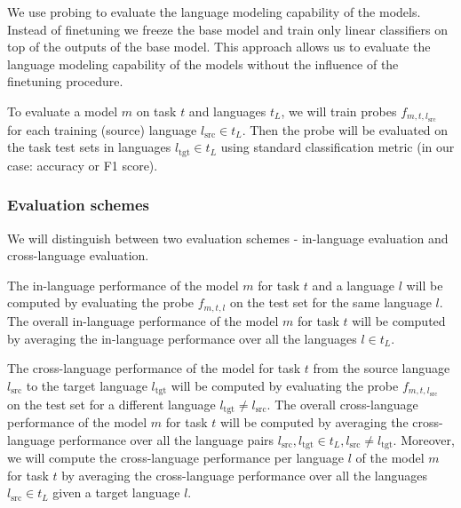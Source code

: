 We use probing \cite{conneau_what_2018,belinkov_interpretability_2020,blevins_analyzing_2022} to evaluate the language modeling capability of the models. Instead of finetuning we freeze the base model and train only linear classifiers on top of the outputs of the base model. This approach allows us to evaluate the language modeling capability of the models without the influence of the finetuning procedure. 


To evaluate a model $m$ on task $t$ and languages $t_L$, we will train probes $f_{m, t, l_\mathrm{src}}$ for each training (source) language $l_\mathrm{src} \in t_L$. Then the probe will be evaluated on the task test sets in languages $l_\mathrm{tgt} \in t_L$ using standard classification metric (in our case: accuracy or F1 score). 


\subsubsection{Evaluation schemes}

We will distinguish between two evaluation schemes - in-language evaluation and cross-language evaluation. 

The in-language performance of the model $m$ for task $t$ and a language $l$ will be computed by evaluating the probe $f_{m, t, l}$ on the test set for the same language $l$. 
The overall in-language performance of the model $m$ for task $t$ will be computed by averaging the in-language performance over all the languages $l \in t_L$. 

The cross-language performance of the model for task $t$ from the source language $l_\mathrm{src}$ to the target language $l_\mathrm{tgt}$ will be computed by evaluating the probe $f_{m, t, l_\mathrm{src}}$ on the test set for a different language $l_\mathrm{tgt} \neq l_\mathrm{src}$. 
The overall cross-language performance of the model $m$ for task $t$ will be computed by averaging the cross-language performance over all the language pairs $l_\mathrm{src}, l_\mathrm{tgt} \in t_L, l_\mathrm{src} \neq l_\mathrm{tgt}$.
Moreover, we will compute the cross-language performance per language $l$ of the model $m$ for task $t$ by averaging the cross-language performance over all the languages $l_\mathrm{src} \in t_L$ given a target language $l$.

